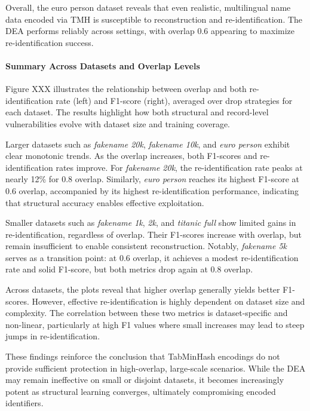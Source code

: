 Overall, the euro person dataset reveals that even realistic, multilingual name data encoded via TMH is susceptible to reconstruction and re-identification. The DEA performs reliably across settings, with overlap 0.6 appearing to maximize re-identification success.


\paragraph{Summary Across Datasets and Overlap Levels}

Figure XXX illustrates the relationship between overlap and both re-identification rate (left) and F1-score (right), averaged over drop strategies for each dataset. The results highlight how both structural and record-level vulnerabilities evolve with dataset size and training coverage.

Larger datasets such as \textit{fakename 20k}, \textit{fakename 10k}, and \textit{euro person} exhibit clear monotonic trends. As the overlap increases, both F1-scores and re-identification rates improve. For \textit{fakename 20k}, the re-identification rate peaks at nearly 12\% for 0.8 overlap. Similarly, \textit{euro person} reaches its highest F1-score at 0.6 overlap, accompanied by its highest re-identification performance, indicating that structural accuracy enables effective exploitation.

Smaller datasets such as \textit{fakename 1k}, \textit{2k}, and \textit{titanic full} show limited gains in re-identification, regardless of overlap. Their F1-scores increase with overlap, but remain insufficient to enable consistent reconstruction. Notably, \textit{fakename 5k} serves as a transition point: at 0.6 overlap, it achieves a modest re-identification rate and solid F1-score, but both metrics drop again at 0.8 overlap.

Across datasets, the plots reveal that higher overlap generally yields better F1-scores. However, effective re-identification is highly dependent on dataset size and complexity. The correlation between these two metrics is dataset-specific and non-linear, particularly at high F1 values where small increases may lead to steep jumps in re-identification.

These findings reinforce the conclusion that TabMinHash encodings do not provide sufficient protection in high-overlap, large-scale scenarios. While the DEA may remain ineffective on small or disjoint datasets, it becomes increasingly potent as structural learning converges, ultimately compromising encoded identifiers.

